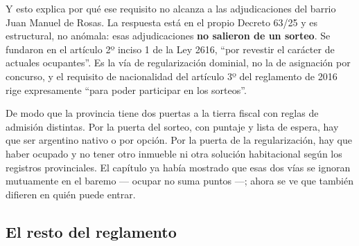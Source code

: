Y esto explica por qué ese requisito no alcanza a las adjudicaciones del barrio Juan Manuel de Rosas. La respuesta está en el propio Decreto 63/25 y es estructural, no anómala: esas adjudicaciones \textbf{no salieron de un sorteo}. Se fundaron en el artículo 2º inciso 1 de la Ley 2616, ``por revestir el carácter de actuales ocupantes''. Es la vía de regularización dominial, no la de asignación por concurso, y el requisito de nacionalidad del artículo 3º del reglamento de 2016 rige expresamente ``para poder participar en los sorteos''.

De modo que la provincia tiene dos puertas a la tierra fiscal con reglas de admisión distintas. Por la puerta del sorteo, con puntaje y lista de espera, hay que ser argentino nativo o por opción. Por la puerta de la regularización, hay que haber ocupado y no tener otro inmueble ni otra solución habitacional según los registros provinciales. El capítulo ya había mostrado que esas dos vías se ignoran mutuamente en el baremo --- ocupar no suma puntos ---; ahora se ve que también difieren en quién puede entrar.

\subsection*{El resto del reglamento}

